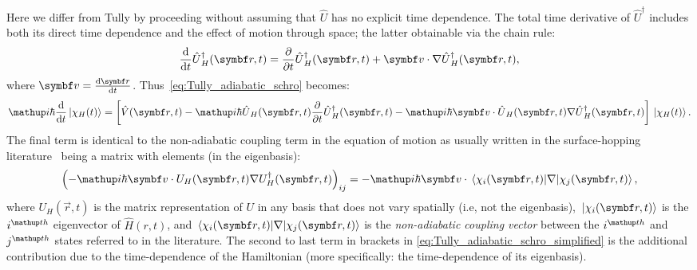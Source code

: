 Here we differ from Tully by proceeding without assuming that $\hat U$ has no explicit time dependence. The total time derivative of $\hat U^\dagger$ includes both its direct time dependence and the effect of motion through space; the latter obtainable via the chain rule:
\begin{align}
\dv{t}\hat U^\dagger_H(\vec r, t)
 = \pdv{t} \hat U^\dagger_H(\vec r, t) + \vec v\cdot \nabla \hat U^\dagger_H(\vec r, t),
\end{align}
where $\vec v = \dv{\vec r}{t}$. Thus~\eqref{eq:Tully_adiabatic_schro} becomes:
\begin{align}\label{eq:Tully_adiabatic_schro_simplified}
\ii\hbar\dv{t}\ket{\chi_H(t)} = \left[
  \hat V(\vec r, t)
  - \ii\hbar\hat U_H(\vec r, t)\pdv{t} \hat U^\dagger_H(\vec r, t)
   - \ii\hbar\vec v\cdot \hat U_H(\vec r, t)\nabla \hat U^\dagger_H(\vec r, t)
 \right]\ket{\chi_H(t)}.
\end{align}
The final term is identical to the non-adiabatic coupling term in the equation of motion as usually written in the surface-hopping literature~\cite{doi:10.1146/annurev-physchem-040215-112245} being a matrix with elements (in the eigenbasis):
\begin{align}
\left(- \ii\hbar\vec v\cdot U_H(\vec r, t)\nabla U^\dagger_H(\vec r, t)\right)_{ij}
= - \ii\hbar\vec v\cdot\matrixel{\chi_i(\vec r, t)}{\nabla}{\chi_j (\vec r, t)},
\end{align}
where $U_H(\vec r, t)$ is the matrix representation of $U$ in any basis that does not vary spatially (i.e, not the eigenbasis), $\ket{\chi_i(\vec r, t)}$ is the $i^\up{th}$ eigenvector of $\hat H(r, t)$, and $\matrixel{\chi_i(\vec r, t)}{\nabla}{\chi_j (\vec r, t)}$ is the \emph{non-adiabatic coupling vector} between the $i^\up{th}$ and $j^\up{th}$ states referred to in the literature. The second to last term in brackets in \eqref{eq:Tully_adiabatic_schro_simplified}
is the additional contribution due to the time-dependence of the Hamiltonian (more specifically: the time-dependence of its eigenbasis).

